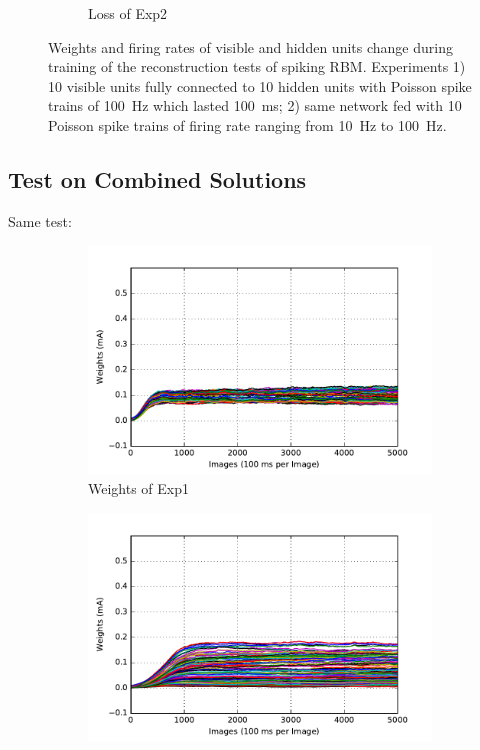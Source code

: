 \begin{figure}
\begin{subfigure}[t]{0.4\textwidth}
		\caption{Loss of Exp2}
	\end{subfigure}
	\caption{Weights and firing rates of visible and hidden units change during training of the reconstruction tests of spiking RBM. 
		Experiments 1) 10 visible units fully connected to 10 hidden units with Poisson spike trains of 100~Hz which lasted 100~ms; 2) same network fed with 10 Poisson spike trains of firing rate ranging from 10~Hz to 100~Hz.}
\end{figure}

\subsection{Test on Combined Solutions}
Same test:
\begin{figure}
	\centering
	\begin{subfigure}[t]{0.4\textwidth}
		\includegraphics[width=\textwidth]{pics_sdlm/07_exp_SAE_all_long/exp1_weights_s.pdf}
		\caption{Weights of Exp1}
	\end{subfigure}
	\begin{subfigure}[t]{0.4\textwidth}
		\includegraphics[width=\textwidth]{pics_sdlm/07_exp_SAE_all_long/exp2_weights_s.pdf}

\end{subfigure}
\end{figure}
